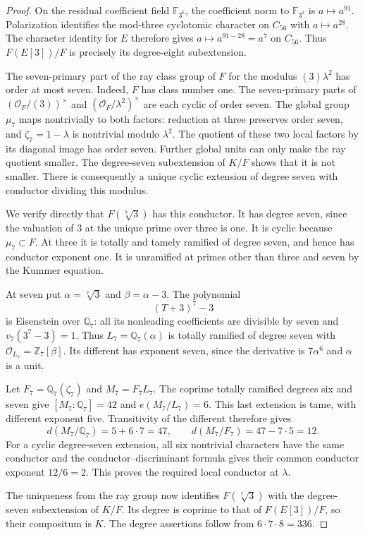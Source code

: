 \begin{proof}
On the residual coefficient field $\mathbb F_{3^6}$, the
coefficient norm to $\mathbb F_{3^2}$ is $a\mapsto a^{91}$.
Polarization identifies the mod-three cyclotomic character
on $C_{56}$ with $a\mapsto a^{28}$.  The character identity
for $E$ therefore gives $a\mapsto a^{91-28}=a^7$ on
$C_{56}$.  Thus $F(E[3])/F$ is precisely its degree-eight
subextension.

The seven-primary part of the ray class group of $F$ for
the modulus $(3)\lambda^2$ has order at most seven.
Indeed, $F$ has class number one.  The seven-primary parts
of $(\mathcal O_F/(3))^\times$ and
$(\mathcal O_F/\lambda^2)^\times$ are each cyclic of
order seven.  The global group $\mu_7$ maps nontrivially
to both factors: reduction at three preserves order seven,
and $\zeta_7=1-\lambda$ is nontrivial modulo $\lambda^2$.
The quotient of these two local factors by its diagonal
image has order seven.  Further global units can only
make the ray quotient smaller.  The degree-seven
subextension of $K/F$ shows that it is not smaller.
There is consequently a unique cyclic extension of degree
seven with conductor dividing this modulus.

We verify directly that $F(\sqrt[7]{3})$ has this conductor.
It has degree seven, since the valuation of $3$ at the
unique prime over three is one.  It is cyclic because
$\mu_7\subset F$.  At three it is totally and tamely
ramified of degree seven, and hence has conductor exponent
one.  It is unramified at primes other than three and seven
by the Kummer equation.

At seven put $\alpha=\sqrt[7]{3}$ and $\beta=\alpha-3$.
The polynomial
\[
 (T+3)^7-3
\]
is Eisenstein over $\mathbb Q_7$: all its nonleading
coefficients are divisible by seven and
$v_7(3^7-3)=1$.  Thus
$L_7=\mathbb Q_7(\alpha)$ is totally ramified of degree
seven with $\mathcal O_{L_7}=\mathbb Z_7[\beta]$.
Its different has exponent seven, since the derivative
is $7\alpha^6$ and $\alpha$ is a unit.

Let $F_7=\mathbb Q_7(\zeta_7)$ and
$M_7=F_7L_7$.  The coprime totally ramified degrees six
and seven give $[M_7:\mathbb Q_7]=42$ and
$e(M_7/L_7)=6$.  This last extension is tame, with
different exponent five.  Transitivity of the different
therefore gives
\[
 d(M_7/\mathbb Q_7)=5+6\cdot7=47,
 \qquad
 d(M_7/F_7)=47-7\cdot5=12.
\]
For a cyclic degree-seven extension, all six nontrivial
characters have the same conductor and the
conductor--discriminant formula gives their common
conductor exponent $12/6=2$.
This proves the required local conductor at $\lambda$.

The uniqueness from the ray group now identifies
$F(\sqrt[7]{3})$ with the degree-seven subextension of
$K/F$.  Its degree is coprime to that of $F(E[3])/F$,
so their compositum is $K$.  The degree assertions
follow from $6\cdot7\cdot8=336$.
\end{proof}

